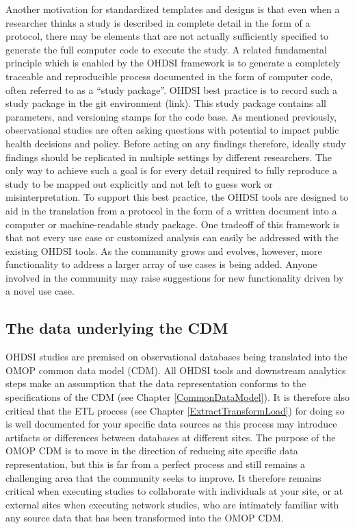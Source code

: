 \documentclass[11pt]{book}
\theoremstyle{definition}
\theoremstyle{definition}
\theoremstyle{definition}
\theoremstyle{remark}
\begin{document}
Another motivation for standardized templates and designs is that even when a researcher thinks a study is described in complete detail in the form of a protocol, there may be elements that are not actually sufficiently specified to generate the full computer code to execute the study. A related fundamental principle which is enabled by the OHDSI framework is to generate a completely traceable and reproducible process documented in the form of computer code, often referred to as a ``study package''. OHDSI best practice is to record such a study package in the git environment (link). This study package contains all parameters, and versioning stamps for the code base. As mentioned previously, observational studies are often asking questions with potential to impact public health decisions and policy. Before acting on any findings therefore, ideally study findings should be replicated in multiple settings by different researchers. The only way to achieve such a goal is for every detail required to fully reproduce a study to be mapped out explicitly and not left to guess work or misinterpretation. To support this best practice, the OHDSI tools are designed to aid in the translation from a protocol in the form of a written document into a computer or machine-readable study package. One tradeoff of this framework is that not every use case or customized analysis can easily be addressed with the existing OHDSI tools. As the community grows and evolves, however, more functionality to address a larger array of use cases is being added. Anyone involved in the community may raise suggestions for new functionality driven by a novel use case.

\hypertarget{the-data-underlying-the-cdm}{%
\subsection{The data underlying the CDM}\label{the-data-underlying-the-cdm}}

OHDSI studies are premised on observational databases being translated into the OMOP common data model (CDM). All OHDSI tools and downstream analytics steps make an assumption that the data representation conforms to the specifications of the CDM (see Chapter \ref{CommonDataModel}). It is therefore also critical that the ETL process (see Chapter \ref{ExtractTransformLoad}) for doing so is well documented for your specific data sources as this process may introduce artifacts or differences between databases at different sites. The purpose of the OMOP CDM is to move in the direction of reducing site specific data representation, but this is far from a perfect process and still remains a challenging area that the community seeks to improve. It therefore remains critical when executing studies to collaborate with individuals at your site, or at external sites when executing network studies, who are intimately familiar with any source data that has been transformed into the OMOP CDM.
\end{document}
